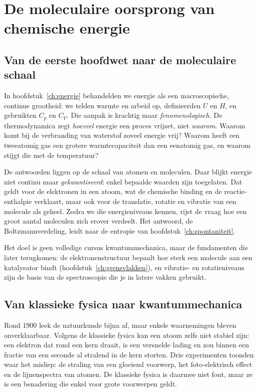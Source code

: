 \chapter{De moleculaire oorsprong van chemische energie}
\label{ch:kwantum}

\section{Van de eerste hoofdwet naar de moleculaire schaal}

In hoofdstuk~\ref{ch:energie} behandelden we energie als een macroscopische, continue grootheid: we telden warmte en arbeid op, definieerden $U$ en $H$, en gebruikten $C_p$ en $C_V$. Die aanpak is krachtig maar \emph{fenomenologisch}. De thermodynamica zegt \emph{hoeveel} energie een proces vrijzet, niet \emph{waarom}. Waarom komt bij de verbranding van waterstof zoveel energie vrij? Waarom heeft een tweeatomig gas een grotere warmtecapaciteit dan een eenatomig gas, en waarom stijgt die met de temperatuur?

De antwoorden liggen op de schaal van atomen en moleculen. Daar blijkt energie niet continu maar \emph{gekwantiseerd}: enkel bepaalde waarden zijn toegelaten. Dat geldt voor de elektronen in een atoom, wat de chemische binding en de reactie-enthalpie verklaart, maar ook voor de translatie, rotatie en vibratie van een molecule als geheel. Zodra we die energieniveaus kennen, rijst de vraag hoe een groot aantal moleculen zich erover verdeelt. Het antwoord, de Boltzmannverdeling, leidt naar de entropie van hoofdstuk~\ref{ch:spontaniteit}.

Het doel is geen volledige cursus kwantummechanica, maar de fundamenten die later terugkomen: de elektronenstructuur bepaalt hoe sterk een molecule aan een katalysator bindt (hoofdstuk~\ref{ch:grensvlakken}), en vibratie- en rotatieniveaus zijn de basis van de spectroscopie die je in latere vakken gebruikt.

\section{Van klassieke fysica naar kwantummechanica}

Rond 1900 leek de natuurkunde bijna af, maar enkele waarnemingen bleven onverklaarbaar. Volgens de klassieke fysica kan een atoom zelfs niet stabiel zijn: een elektron dat rond een kern draait, is een versnelde lading en zou binnen een fractie van een seconde al stralend in de kern storten. Drie experimenten toonden waar het misliep: de straling van een gloeiend voorwerp, het foto-elektrisch effect en de lijnenspectra van atomen. De klassieke fysica is daarmee niet fout, maar ze is een benadering die enkel voor grote voorwerpen geldt.

